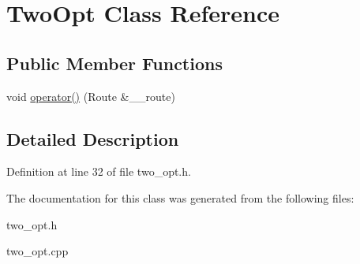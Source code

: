 \hypertarget{classTwoOpt}{
\section{Two\-Opt Class Reference}
\label{classTwoOpt}
}
\subsection*{Public Member Functions}
\begin{CompactItemize}
\item 
\hypertarget{classTwoOpt_ff87d1649a33d42a6d64e8d314ed1af0}{
void \hyperlink{classTwoOpt_ff87d1649a33d42a6d64e8d314ed1af0}{operator()} (Route \&\_\-\_\-route)}
\label{classTwoOpt_ff87d1649a33d42a6d64e8d314ed1af0}

\end{CompactItemize}


\subsection{Detailed Description}




Definition at line 32 of file two\_\-opt.h.

The documentation for this class was generated from the following files:\begin{CompactItemize}
\item 
two\_\-opt.h\item 
two\_\-opt.cpp\end{CompactItemize}
